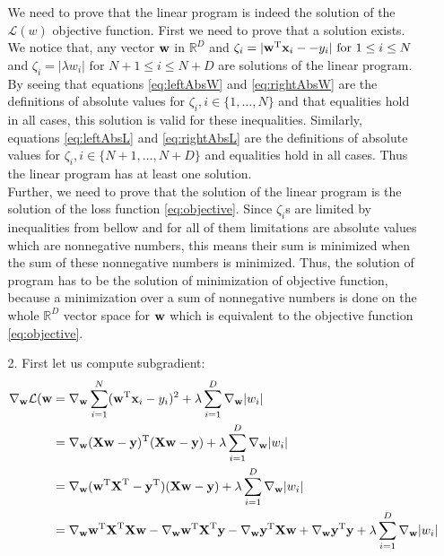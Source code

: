 \documentclass[10pt,a4paper]{article}
\begin{document}
\begin{enumerate}
\begin{enumerate}
We need to prove that the linear program is indeed the solution of the $\mathcal{L}(w)$ objective function. First we need to prove that a solution exists. We notice that, any vector $\textbf{\text{{w}}}$ in $\mathbb{R}^D$ and $\zeta_i=|\textbf{\text{{w}}} ^ \text{T}\textbf{\text{{x}}}_i - -y_i| \text{ for } 1 \leq i \leq N$ and $\zeta_i=|\lambda w_i| \text{ for } N + 1 \leq i \leq N + D $ are solutions of the linear program. By seeing that equations \ref{eq:leftAbsW}  and \ref{eq:rightAbsW} are the definitions of absolute values for $\zeta_i, i\in \{1, \ldots, N\}$ and that equalities hold in all cases, this solution is valid for these inequalities. Similarly, equations \ref{eq:leftAbsL} and \ref{eq:rightAbsL} are the definitions of absolute values for $\zeta_i, i\in \{N+1, \ldots, N+D\}$ and equalities hold in all cases. Thus the linear program has at least one solution. 
\\
Further, we need to prove that the solution of the linear program is the solution of the loss function \ref{eq:objective}. Since $\zeta_i$s are limited by inequalities from bellow and for all of them limitations are absolute values which are nonnegative numbers, this means their sum is minimized when the sum of these nonnegative numbers is minimized. Thus, the solution of program has to be the solution of minimization of objective function, because a minimization over a sum of nonnegative numbers is done on the whole $\mathbb{R}^D$ vector space for $\textbf{\text{{w}}}$ which is equivalent to the objective function \ref{eq:objective}. 
\item[2.] 
First let us compute subgradient:
\begin{align}
	\gradient{w} \mathcal{L}(\vect{w} &= 
	\gradient{w} \sum_{i=1}^N(\transpose{\vect{w}}\vect{x}_i - y_i)^2 + \lambda\sum_{i=1}^D\gradient{w} |w_i| \label{eq:pass} \\
	&= \gradient{w} \transpose{(\mat{X}\vect{w} - \vect{y})}(\mat{X}\vect{w}-\vect{y})+\lambda \sum_{i=1}^D \gradient{w} |w_i| \label{eq:CompactForm}\\
	&= \gradient{w}(\transpose{\vect{w}}\transpose{\mat{X}} - \transpose{\vect{y}})(\mat{X}\vect{w}-\vect{y}) + \lambda \sum_{i=1}^D \gradient{w} |w_i| \label{eq:transpProp} \\
	&=\gradient{w} \transpose{\vect{w}}\transpose{\mat{X}}\mat{X}\vect{w}-\gradient{w}\transpose{\vect{w}}\transpose{\mat{X}}\vect{y}- \gradient{w} \transpose{\vect{y}}\mat{X}\vect{w} + \gradient{w}\transpose{\vect{y}}\vect{y} +  \lambda \sum_{i=1}^D \gradient{w} |w_i|\label{eq:simpleCalc}\\

\end{align}
\end{enumerate}
\end{enumerate}
\end{document}

